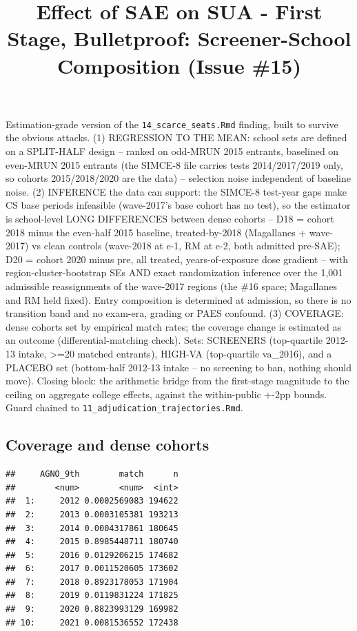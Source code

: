 \documentclass[
]{article}
\title{Effect of SAE on SUA - First Stage, Bulletproof: Screener-School
Composition (Issue \#15)}
\author{}
\date{\vspace{-2.5em}}
\begin{document}
\maketitle

Estimation-grade version of the \texttt{14\_scarce\_seats.Rmd} finding,
built to survive the obvious attacks. (1) REGRESSION TO THE MEAN: school
sets are defined on a SPLIT-HALF design -- ranked on odd-MRUN 2015
entrants, baselined on even-MRUN 2015 entrants (the SIMCE-8 file carries
tests 2014/2017/2019 only, so cohorts 2015/2018/2020 are the data) --
selection noise independent of baseline noise. (2) INFERENCE the data
can support: the SIMCE-8 test-year gaps make CS base periods infeasible
(wave-2017's base cohort has no test), so the estimator is school-level
LONG DIFFERENCES between dense cohorts -- D18 = cohort 2018 minus the
even-half 2015 baseline, treated-by-2018 (Magallanes + wave-2017) vs
clean controls (wave-2018 at e-1, RM at e-2, both admitted pre-SAE); D20
= cohort 2020 minus pre, all treated, years-of-exposure dose gradient --
with region-cluster-bootstrap SEs AND exact randomization inference over
the 1,001 admissible reassignments of the wave-2017 regions (the \#16
space; Magallanes and RM held fixed). Entry composition is determined at
admission, so there is no transition band and no exam-era, grading or
PAES confound. (3) COVERAGE: dense cohorts set by empirical match rates;
the coverage change is estimated as an outcome (differential-matching
check). Sets: SCREENERS (top-quartile 2012-13 intake, \textgreater=20
matched entrants), HIGH-VA (top-quartile va\_2016), and a PLACEBO set
(bottom-half 2012-13 intake -- no screening to ban, nothing should
move). Closing block: the arithmetic bridge from the first-stage
magnitude to the ceiling on aggregate college effects, against the
within-public +-2pp bounds. Guard chained to
\texttt{11\_adjudication\_trajectories.Rmd}.

\hypertarget{coverage-and-dense-cohorts}{%
\subsection{Coverage and dense
cohorts}\label{coverage-and-dense-cohorts}}

\begin{verbatim}
##     AGNO_9th        match      n
##        <num>        <num>  <int>
##  1:     2012 0.0002569083 194622
##  2:     2013 0.0003105381 193213
##  3:     2014 0.0004317861 180645
##  4:     2015 0.8985448711 180740
##  5:     2016 0.0129206215 174682
##  6:     2017 0.0011520605 173602
##  7:     2018 0.8923178053 171904
##  8:     2019 0.0119831224 171825
##  9:     2020 0.8823993129 169982
## 10:     2021 0.0081536552 172438
\end{verbatim}
\end{document}
